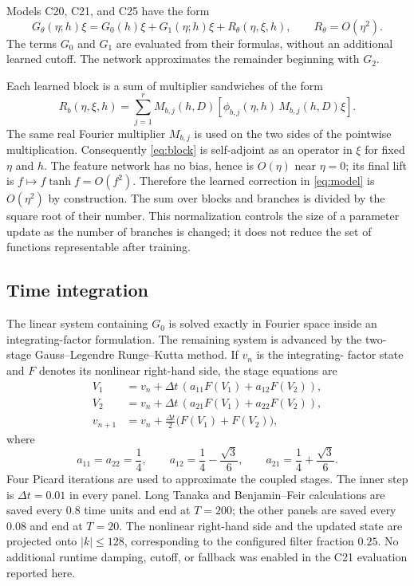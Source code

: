 \documentclass[11pt]{article}
\newcommand{\Gmodel}{G_{\theta}}
\begin{document}
Models C20, C21, and C25 have the form
\begin{equation}
  \Gmodel(\eta;h)\xi
  =G_0(h)\xi+G_1(\eta;h)\xi+R_\theta(\eta,\xi,h),
  \qquad R_\theta=O(\eta^2).
  \label{eq:model}
\end{equation}
The terms $G_0$ and $G_1$ are evaluated from their formulas, without an
additional learned cutoff.  The network approximates the remainder beginning
with $G_2$.

Each learned block is a sum of multiplier sandwiches of the form
\begin{equation}
  R_{b}(\eta,\xi,h)
  =\sum_{j=1}^{r}M_{b,j}(h,D)
       \left[\phi_{b,j}(\eta,h)\,M_{b,j}(h,D)\xi\right].
  \label{eq:block}
\end{equation}
The same real Fourier multiplier $M_{b,j}$ is used on the two sides of the
pointwise multiplication.  Consequently \eqref{eq:block} is self-adjoint as
an operator in $\xi$ for fixed $\eta$ and $h$.  The feature network has no
bias, hence is $O(\eta)$ near $\eta=0$; its final lift is
$f\mapsto f\tanh f=O(f^2)$.  Therefore the learned correction in
\eqref{eq:model} is $O(\eta^2)$ by construction.  The sum over blocks and
branches is divided by the square root of their number.  This normalization
controls the size of a parameter update as the number of branches is changed;
it does not reduce the set of functions representable after training.

\subsection{Time integration}

The linear system containing $G_0$ is solved exactly in Fourier space inside
an integrating-factor formulation.  The remaining system is advanced by the
two-stage Gauss--Legendre Runge--Kutta method.  If $v_n$ is the integrating-
factor state and $F$ denotes its nonlinear right-hand side, the stage
equations are
\begin{align}
  V_1 &=v_n+\Delta t\,(a_{11}F(V_1)+a_{12}F(V_2)),\\
  V_2 &=v_n+\Delta t\,(a_{21}F(V_1)+a_{22}F(V_2)),\\
  v_{n+1}&=v_n+\frac{\Delta t}{2}\bigl(F(V_1)+F(V_2)\bigr),
  \label{eq:gl2}
\end{align}
where
\begin{equation}
  a_{11}=a_{22}=\frac14,
  \qquad
  a_{12}=\frac14-\frac{\sqrt3}{6},
  \qquad
  a_{21}=\frac14+\frac{\sqrt3}{6}.
\end{equation}
Four Picard iterations are used to approximate the coupled stages.  The inner
step is $\Delta t=0.01$ in every panel.  Long Tanaka and Benjamin--Feir
calculations are saved every $0.8$ time units and end at $T=200$; the other
panels are saved every $0.08$ and end at $T=20$.  The nonlinear right-hand
side and the updated state are projected onto $|k|\leq128$, corresponding to
the configured filter fraction $0.25$.  No additional runtime damping,
cutoff, or fallback was enabled in the C21 evaluation reported here.
\end{document}
